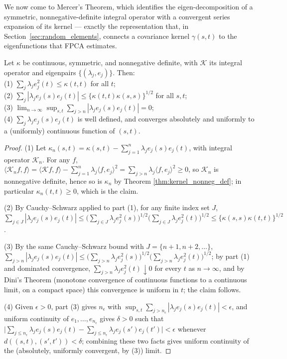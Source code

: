 We now come to Mercer's Theorem, which identifies the eigen-decomposition
of a symmetric, nonnegative-definite integral operator with a convergent
series expansion of its kernel --- exactly the representation that, in
Section~\ref{sec:random_elements}, connects a covariance kernel
$\gamma(s,t)$ to the eigenfunctions that FPCA estimates.

\begin{lemma}
\label{lem:mercer_lemma}
Let $\kappa$ be continuous, symmetric, and nonnegative definite, with
$\mathcal{K}$ its integral operator and eigenpairs $\{(\lambda_j,e_j)\}$.
Then: \\
(1) $\sum_j\lambda_je_j^2(t)\leq\kappa(t,t)$ for all $t$; \\
(2) $\sum_j|\lambda_je_j(s)e_j(t)|\leq\{\kappa(t,t)\kappa(s,s)\}^{1/2}$ for all
$s,t$; \\
(3) $\lim_{n\to\infty}\sup_{s,t}\sum_{j>n}|\lambda_je_j(s)e_j(t)|=0$; \\
(4) $\sum_j\lambda_je_j(s)e_j(t)$ is well defined, and converges absolutely
and uniformly to a (uniformly) continuous function of $(s,t)$.
\end{lemma}

\begin{proof}
(1) Let $\kappa_n(s,t)=\kappa(s,t)-\sum_{j=1}^n\lambda_je_j(s)e_j(t)$, with
integral operator $\mathcal{K}_n$. For any $f$, $\langle\mathcal{K}_nf,f
\rangle=\langle\mathcal{K}f,f\rangle-\sum_{j=1}^n\lambda_j\langle f,e_j
\rangle^2=\sum_{j>n}\lambda_j\langle f,e_j\rangle^2\geq 0$, so
$\mathcal{K}_n$ is nonnegative definite, hence so is $\kappa_n$ by Theorem
\ref{thm:kernel_nonneg_def}; in particular $\kappa_n(t,t)\geq 0$, which is
the claim.

(2) By Cauchy--Schwarz applied to part (1), for any finite index set $J$,
$\sum_{j\in J}|\lambda_je_j(s)e_j(t)|\leq\big(\sum_{j\in J}\lambda_j
e_j^2(s)\big)^{1/2}\big(\sum_{j\in J}\lambda_je_j^2(t)\big)^{1/2}\leq
\{\kappa(s,s)\kappa(t,t)\}^{1/2}$.

(3) By the same Cauchy--Schwarz bound with $J=\{n+1,n+2,\dots\}$,
$\sum_{j>n}|\lambda_je_j(s)e_j(t)| \leq \big(\sum_{j>n}\lambda_je_j^2(s)
\big)^{1/2}\big(\sum_{j>n}\lambda_je_j^2(t)\big)^{1/2}$; by part (1) and
dominated convergence, $\sum_{j>n}\lambda_je_j^2(t)\downarrow 0$ for every
$t$ as $n\to\infty$, and by Dini's Theorem (monotone convergence of
continuous functions to a continuous limit, on a compact space) this
convergence is uniform in $t$; the claim follows.

(4) Given $\epsilon>0$, part (3) gives $n_\epsilon$ with $\sup_{s,t}
\sum_{j>n_\epsilon}|\lambda_je_j(s)e_j(t)|<\epsilon$, and uniform
continuity of $e_1,\dots,e_{n_\epsilon}$ gives $\delta>0$ such that
$\big|\sum_{j\leq n_\epsilon}\lambda_je_j(s)e_j(t)-\sum_{j\leq n_\epsilon}
\lambda_je_j(s')e_j(t')\big|<\epsilon$ whenever $d((s,t),(s',t'))<\delta$;
combining these two facts gives uniform continuity of the (absolutely,
uniformly convergent, by (3)) limit.
\end{proof}

